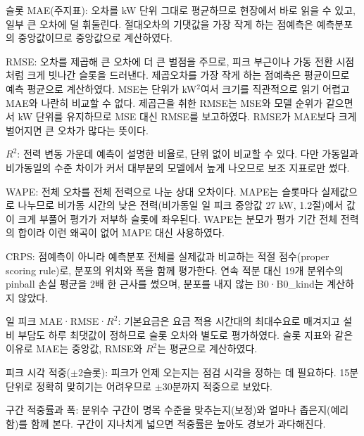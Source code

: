 \begin{hwplist}
\item 슬롯 MAE(주지표): 오차를 kW 단위 그대로 평균하므로 현장에서 바로 읽을 수 있고, 일부 큰 오차에 덜 휘둘린다. 절대오차의 기댓값을 가장 작게 하는 점예측은 예측분포의 중앙값이므로 중앙값으로 계산하였다.
\item RMSE: 오차를 제곱해 큰 오차에 더 큰 벌점을 주므로, 피크 부근이나 가동 전환 시점처럼 크게 빗나간 슬롯을 드러낸다. 제곱오차를 가장 작게 하는 점예측은 평균이므로 예측 평균으로 계산하였다. MSE는 단위가 kW$^2$여서 크기를 직관적으로 읽기 어렵고 MAE와 나란히 비교할 수 없다. 제곱근을 취한 RMSE는 MSE와 모델 순위가 같으면서 kW 단위를 유지하므로 MSE 대신 RMSE를 보고하였다. RMSE가 MAE보다 크게 벌어지면 큰 오차가 많다는 뜻이다.
\item $R^2$: 전력 변동 가운데 예측이 설명한 비율로, 단위 없이 비교할 수 있다. 다만 가동일과 비가동일의 수준 차이가 커서 대부분의 모델에서 높게 나오므로 보조 지표로만 썼다.
\item WAPE: 전체 오차를 전체 전력으로 나눈 상대 오차이다. MAPE는 슬롯마다 실제값으로 나누므로 비가동 시간의 낮은 전력(비가동일 일 피크 중앙값 27 kW, 1.2절)에서 값이 크게 부풀어 평가가 저부하 슬롯에 좌우된다. WAPE는 분모가 평가 기간 전체 전력의 합이라 이런 왜곡이 없어 MAPE 대신 사용하였다.
\item CRPS: 점예측이 아니라 예측분포 전체를 실제값과 비교하는 적절 점수(proper scoring rule)로, 분포의 위치와 폭을 함께 평가한다. 연속 적분 대신 19개 분위수의 pinball 손실 평균을 2배 한 근사를 썼으며, 분포를 내지 않는 B0·B0\_kind는 계산하지 않았다.
\item 일 피크 MAE·RMSE·$R^2$: 기본요금은 요금 적용 시간대의 최대수요로 매겨지고 설비 부담도 하루 최댓값이 정하므로 슬롯 오차와 별도로 평가하였다. 슬롯 지표와 같은 이유로 MAE는 중앙값, RMSE와 $R^2$는 평균으로 계산하였다.
\item 피크 시각 적중($\pm$2슬롯): 피크가 언제 오는지는 점검 시각을 정하는 데 필요하다. 15분 단위로 정확히 맞히기는 어려우므로 $\pm$30분까지 적중으로 보았다.
\item 구간 적중률과 폭: 분위수 구간이 명목 수준을 맞추는지(보정)와 얼마나 좁은지(예리함)를 함께 본다. 구간이 지나치게 넓으면 적중률은 높아도 경보가 과다해진다.
\end{hwplist}

